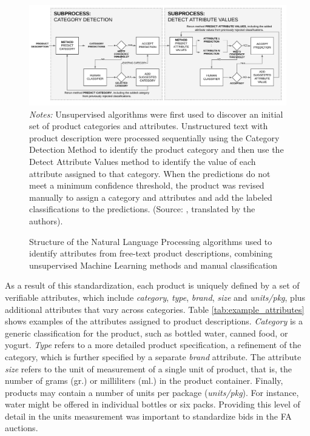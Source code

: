 \begin{figure}[t]
\caption{Structure of the Natural Language Processing algorithms used to identify attributes from free-text product descriptions, combining unsupervised Machine Learning methods and manual classification}
    \includegraphics[scale = 0.2]{imagenes/procurement/Attribute detection.jpg}
    \small{\textit{Notes:} Unsupervised algorithms were first used to discover an initial set of product categories and attributes. Unstructured text with product description were processed sequentially using the Category Detection Method to identify the product category and then use the Detect Attribute Values method to identify the value of each attribute assigned to that category. When the predictions do not meet a minimum confidence threshold, the product was revised manually to assign a category and attributes and add the labeled classifications to the predictions. (Source: \cite{guerra2019diseno}, translated by the authors). } 
    \label{fig:NLP}
\end{figure}

As a result of this standardization, each product is uniquely defined by a set of verifiable attributes, which include \textit{category}, \textit{type}, \textit{brand}, \textit{size} and \textit{units/pkg}, plus additional attributes that vary across categories. Table \ref{tab:example_attributes} shows examples of the attributes assigned to product descriptions. \textit{Category} is a generic classification for the product, such as bottled water, canned food, or yogurt.  \textit{Type} refers to a more detailed product specification, a refinement of the  category, which is further specified by a separate \textit{brand} attribute.
The attribute \textit{size} refers to the unit of measurement of a single unit of product, that is, the number of grams (gr.) or milliliters (ml.) in the product container. Finally, products may contain a number of units per package (\textit{units/pkg}). For instance, water might be offered in individual bottles or six packs. Providing this level of detail in the units measurement was important to standardize  bids in the FA auctions.

